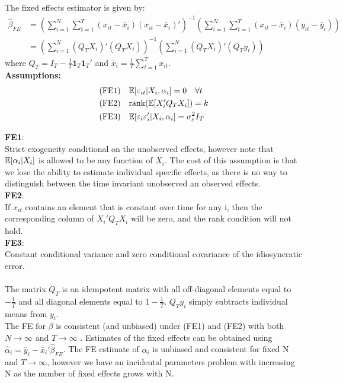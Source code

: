 \documentclass[DIV=14,titlepage=false]{scrreprt}
\begin{document}
\begin{definition}
    The fixed effects estimator is given by:
    \begin{align*}
        \hat{\beta}_{FE} &= \left(\sum_{i=1}^N\sum_{t=1}^T (x_{it} - \bar{x}_i)(x_{it} - \bar{x}_i)'\right)^{-1}\left(\sum_{i=1}^N\sum_{t=1}^T (x_{it} - \bar{x}_i)(y_{it} - \bar{y}_i)\right)\\
        &= \left(\sum_{i=1}^N (Q_T X_i)'(Q_T X_i)\right)^{-1}\left(\sum_{i=1}^N (Q_T X_i)'(Q_T y_i)\right)
    \end{align*}
    where $Q_T = I_T - \frac{1}{T}\mathbf{1}_T\mathbf{1}_T'$ and $\bar{x}_i = \frac{1}{T}\sum_{t=1}^T x_{it}$.\\
    \textbf{Assumptions:}
    \begin{align*}
        \text{(FE1)}\quad &\mathbb{E}[\varepsilon_{it}|X_i, \alpha_i] = 0 \quad \forall t \\
        \text{(FE2)}\quad &\text{rank}(\mathbb{E}[X_i'Q_TX_i]) = k\\
        \text{(FE3)}\quad &\mathbb{E}[\varepsilon_{i}\varepsilon_{i}'|X_i, \alpha_i] = \sigma^2_{\varepsilon}I_T
    \end{align*}
\end{definition}
\textbf{FE1}:\\
Strict exogeneity conditional on the unobserved effects, however note that $\mathbb{E}[\alpha_i|X_i]$ is allowed to be any function of $X_i$. The cost of this assumption is that we lose the ability to estimate individual specific effects, as there is no way to distinguish between the time invariant unobserved an observed effects.\\
\textbf{FE2}:\\
If $x_{it}$ contains an element that is constant over time for any i, then the corresponding column of $X_i'Q_TX_i$ will be zero, and the rank condition will not hold.\\
\textbf{FE3}:\\
Constant conditional variance and zero conditional covariance of the idiosyncratic error.\\\\
The matrix $Q_T$ is an idempotent matrix with all off-diagonal elements equal to $-\frac{1}{T}$ and all diagonal elements equal to $1-\frac{1}{T}$. $Q_T y_i$ simply subtracts individual means from $y_i$.\\ 
 The FE for $\beta$ is consistent (and unbiased) under (FE1) and (FE2) with both $N \to \infty$ and $T \to \infty$ . Estimates of the fixed effects can be obtained using $\hat \alpha_i = \bar{y}_i - \bar{x}_i'\hat \beta_{FE}$. The FE estimate of $\alpha_i$  is unbiased and consistent for fixed N and $T \to \infty$, however we have an incidental parameters problem with increasing N as the number of fixed effects grows with N.\\
\end{document}
